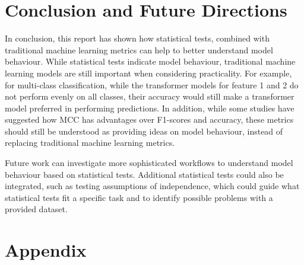 \documentclass[10.7pt, onecolumn]{article}
\begin{document}
\section{Conclusion and Future Directions}

In conclusion, this report has shown how statistical tests, combined with traditional machine learning metrics can help to better understand model behaviour. While statistical tests indicate model behaviour, traditional machine learning models are still important when considering practicality. For example, for multi-class classification, while the transformer models for feature 1 and 2 do not perform evenly on all classes, their accuracy would still make a transformer model preferred in performing predictions. In addition, while some studies have suggested how MCC has advantages over F1-scores and accuracy\cite{articlesss}, these metrics should still be understood as providing ideas on model behaviour, instead of replacing traditional machine learning metrics.

Future work can investigate more sophisticated workflows to understand model behaviour based on statistical tests. Additional statistical tests could also be integrated, such as testing assumptions of independence, which could guide what statistical tests fit a specific task and to identify possible problems with a provided dataset\cite{article2}.



\newpage



\section{Appendix}
\end{document}
